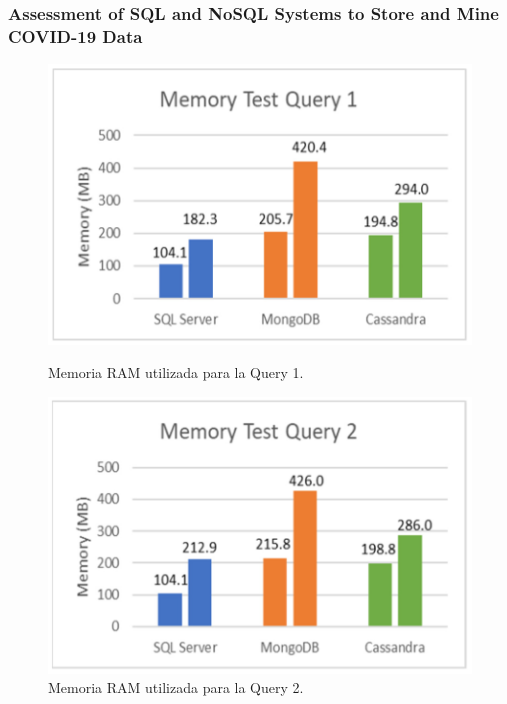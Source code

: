 \begin{frame}
    \frametitle{Assessment of SQL and NoSQL Systems to Store and Mine COVID-19 Data}

    \begin{figure}[H]
        \centering
        \begin{minipage}[b]{0.48\textwidth}
            \centering
            \includegraphics[width=\textwidth]{images/cov19-mem-test-q1.png}
            \caption{Memoria RAM utilizada para la Query 1.}
            \label{cov19-memtest-q1}
        \end{minipage}
        \hfill
        \begin{minipage}[b]{0.48\textwidth}
            \centering
            \includegraphics[width=\textwidth]{images/cov19-mem-test-q2.png}
            \caption{Memoria RAM utilizada para la Query 2.}
            \label{cov19-memtest-q2}
        \end{minipage}
    \end{figure}
\end{frame}

